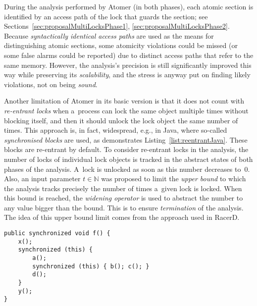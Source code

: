 During the analysis performed by Atomer (in both phases), each atomic section is identified by an access path of the lock that guards the section; see Sections~\ref{sec:proposalMultiLocksPhase1}, \ref{sec:proposalMultiLocksPhase2}. Because \emph{syntactically identical access paths} are used as the means for distinguishing atomic sections, some atomicity violations could be missed (or some false alarms could be reported) due to distinct access paths that refer to the same memory. However, the analysis's precision is still significantly improved this way while preserving its \emph{scalability}, and the stress is anyway put on finding likely violations, not on being \emph{sound}.

Another limitation of Atomer in its basic version is that it does not count with \emph{re-entrant locks} when a~process can lock the same object multiple times without blocking itself, and then it should unlock the lock object the same number of times. This approach is, in fact, widespread, e.g., in Java, where so-called \emph{synchronised blocks} are used, as demonstrates Listing~\ref{list:reentrantJava}. These blocks are re-entrant by default. To consider re-entrant locks in the analysis, the number of locks of individual lock objects is tracked in the abstract states of both phases of the analysis. A~lock is unlocked as soon as this number decreases to~0. Also, an input parameter $ t \in \mathbb{N} $ was proposed to limit the \emph{upper bound} to which the analysis tracks precisely the number of times a~given lock is locked. When this bound is reached, the \emph{widening operator} is used to abstract the number to any value bigger than the bound. This is to ensure \emph{termination} of the analysis. The idea of this upper bound limit comes from the approach used in RacerD.

\begin{lstlisting}[style=java, label={list:reentrantJava}, float=hbt, caption={An example of \emph{re-entrant locks} in Java using the \texttt{synchronized} keyword, which is implemented as a~\emph{monitor}. In the example, there are three locks used simultaneously over the same object. The entire method~\texttt{f} is synchronised, which implicitly uses \texttt{this} as a~\emph{lock object}. Furthermore, the two \emph{synchronised blocks} explicitly use the lock object \texttt{this}}]
public synchronized void f() {
    x();
    synchronized (this) {
        a();
        synchronized (this) { b(); c(); }
        d();
    }
    y();
}
\end{lstlisting}


